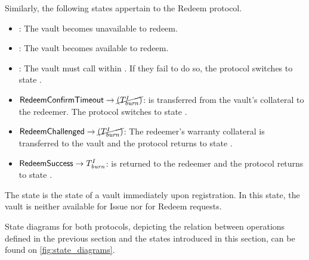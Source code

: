 Similarly, the following states appertain to the Redeem protocol.
\begin{itemize}
    \item \statenr:
    The vault becomes unavailable to redeem.
    
    \item \statevar:
    The vault becomes available to redeem.
    
    \item
    \begin{sloppypar}
    \statearc:
    The vault must call \confirmRedeemop within \dcr.
    If they fail to do so, the protocol switches to state \staterct.
    \end{sloppypar}

    \item
    \begin{sloppypar}
    $\mathsf{RedeemConfirmTimeout} \rightarrow \cancel{(T^I_{\mathit{burn}})}$:
    \iw is transferred from the vault's collateral to the redeemer.
    The protocol switches to state \statevar.
    \end{sloppypar}

    \item
    \begin{sloppypar}
    $\mathsf{RedeemChallenged} \rightarrow \cancel{(T^I_{\mathit{burn}})}$:
    The redeemer's warranty collateral \iw is transferred to the vault and the protocol returns to state \statevar.
    \end{sloppypar}
    
    \item $\mathsf{RedeemSuccess} \rightarrow T^I_{\mathit{burn}}$:
    \iw is returned to the redeemer and the protocol returns to state \statevar.
\end{itemize} 

The state \statevr is the state of a vault immediately upon registration.
In this state, the vault is neither available for Issue nor for Redeem requests.

State diagrams for both protocols, depicting the relation between operations defined in the previous section and the states introduced in this section, can be found on \cref{fig:state_diagrams}.

